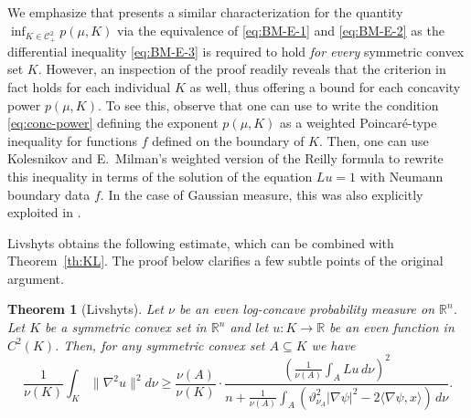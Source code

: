 \documentclass[11pt,leqno]{article}
\newtheorem{theorem}{Theorem}[section]
\theoremstyle{definition}
\theoremstyle{remark}
\numberwithin{equation}{section}
\newcommand{\gr}{\geqslant}
\newcommand{\1}{\textbf{1}}
\begin{document}
We emphasize that \cite[Lemma~2.3]{Kolesnikov-Livshyts-2021} presents a similar characterization for the quantity $\inf_{K\in\mathcal{C}_+^2} p(\mu,K)$ via the equivalence of \eqref{eq:BM-E-1} and \eqref{eq:BM-E-2} as the differential inequality \eqref{eq:BM-E-3} is required to hold \emph{for every} symmetric convex set $K$. However, an inspection of the proof readily reveals that the criterion in fact holds for each individual $K$ as well, thus offering a bound for each concavity power $p(\mu, K)$. To see this, observe that one can use \cite[Proposition~3.2]{Kolesnikov-Livshyts-2021} to write the condition \eqref{eq:conc-power} defining the exponent $p(\mu,K)$ as a weighted Poincar\'e-type inequality for functions $f$ defined on the boundary of $K$. Then, one can use Kolesnikov and E.~Milman's \cite{Kolesnikov-Milman-2018} weighted version of the Reilly formula \cite[Proposition~3.4]{Kolesnikov-Livshyts-2021} to rewrite this inequality in terms of the solution of the equation $Lu=1$ with Neumann boundary data $f$. In the case of Gaussian measure, this was also explicitly exploited in \cite[Proof of Theorem A]{Liv24}.

Livshyts \cite{Livshyts-2023} obtains the following estimate, which can be combined with Theorem~\ref{th:KL}. The proof below clarifies a few
subtle points of the original argument.

\begin{theorem}[Livshyts]\label{th:L-reduction}Let $\nu$ be an even log-concave probability measure on $\mathbb{R}^n$. Let $K$ be a
symmetric convex set in $\mathbb{R}^n$ and let $u:K\to\mathbb{R}$ be an even function in $C^2(K)$. Then, for any symmetric
convex set $A\subseteq K$ we have
$$\frac{1}{\nu(K)}\int_K\|\nabla^2u\|^2d\nu \gr \frac{\nu(A)}{\nu(K)}\cdot\frac{\left(\frac{1}{\nu(A)}\int_ALu\,d\nu\right)^2}{n+\frac{1}{\nu(A)}\int_A(\vartheta_{\nu_A}^2|\nabla \psi|^2-2\langle \nabla\psi,x\rangle )\,d\nu}.$$
\end{theorem}
\end{document}
